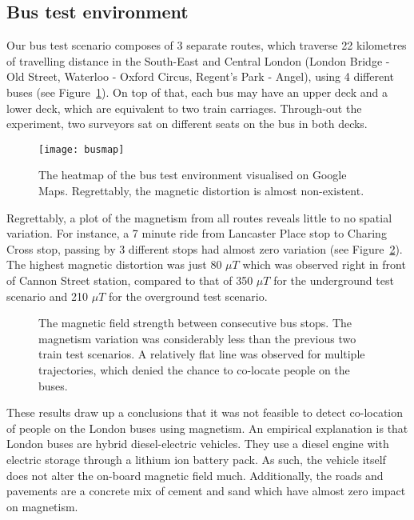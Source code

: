 \documentclass[conference]{IEEEtran}
\begin{document}
\subsection{Bus test environment}
Our bus test scenario composes of 3 separate routes, which traverse 22 kilometres of travelling distance in the South-East and Central London (London Bridge - Old Street, Waterloo - Oxford Circus, Regent's Park - Angel), using 4 different buses (see Figure~\ref{busmap}). On top of that, each bus may have an upper deck and a lower deck, which are equivalent to two train carriages. Through-out the experiment, two surveyors sat on different seats on the bus in both decks.
\begin{figure}[!t]
	\centering
	\texttt{[image: busmap]}
	\caption{The heatmap of the bus test environment visualised on Google Maps. Regrettably, the magnetic distortion is almost non-existent.}
	\label{busmap}
\end{figure}

Regrettably, a plot of the magnetism from all routes reveals little to no spatial variation. For instance, a 7 minute ride from Lancaster Place stop to Charing Cross stop, passing by 3 different stops had almost zero variation (see Figure~\ref{busmagneticvariation}). The highest magnetic distortion was just 80 $\mu T$ which was observed right in front of Cannon Street station, compared to that of 350 $\mu T$ for the underground test scenario and 210 $\mu T$ for the overground test scenario. 
\begin{figure}[!t]
	\centering
	
	\hfil
	\hfil
	
	\caption{The magnetic field strength between consecutive bus stops. The magnetism variation was considerably less than the previous two train test scenarios. A relatively flat line was observed for multiple trajectories, which denied the chance to co-locate people on the buses.}
	\label{busmagneticvariation}
\end{figure}

These results draw up a conclusions that it was not feasible to detect co-location of people on the London buses using magnetism. An empirical explanation is that London buses are hybrid diesel-electric vehicles. They use a diesel engine with electric storage through a lithium ion battery pack. As such, the vehicle itself does not alter the on-board magnetic field much. Additionally, the roads and pavements are a concrete mix of cement and sand which have almost zero impact on magnetism.
\end{document}
